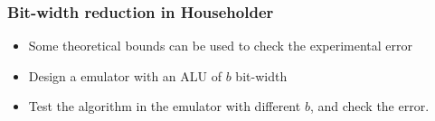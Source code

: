 \documentclass[serif, 12pt]{beamer}
\begin{document}

\begin{frame}
%
\frametitle{Bit-width reduction in Householder}
%
\begin{itemize}
\item Some theoretical bounds can be used to check the experimental error
\item Design a emulator with an ALU of $b$ bit-width
\item Test the algorithm in the emulator with different $b$, and check the 
error.
\end{itemize}

\end{frame}
\end{document}
